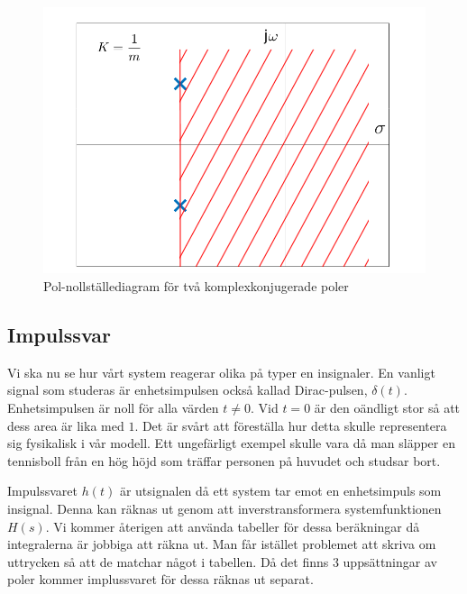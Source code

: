 \begin{figure}[H] %
    \centering
    \includegraphics[scale=0.33]{bilder/pol_nollstallediagram_komplexa_poler}
    \caption{Pol-nollställediagram för två komplexkonjugerade poler}
    \label{fig:pol_nollstallediagram_komplexa_poler}
\end{figure}
 
\newpage
\subsection{Impulssvar}
Vi ska nu se hur vårt system reagerar olika på typer en insignaler. En vanligt signal som studeras är enhetsimpulsen också kallad Dirac-pulsen, $\delta(t)$. 
Enhetsimpulsen är noll för alla värden $t\ne 0$. Vid $t = 0$ är den oändligt stor så att dess area är lika med $1$. Det är svårt att föreställa hur detta skulle representera sig fysikalisk i vår modell. Ett ungefärligt exempel skulle vara då man släpper en tennisboll från en hög höjd som träffar personen på huvudet och studsar bort. 

Impulssvaret $h(t)$ är utsignalen då ett system tar emot en enhetsimpuls som insignal. Denna kan räknas ut genom att inverstransformera systemfunktionen $H(s)$. Vi kommer återigen att använda tabeller för dessa beräkningar då integralerna är jobbiga att räkna ut. Man får istället problemet att skriva om uttrycken så att de matchar något i tabellen. Då det finns 3 uppsättningar av poler kommer implussvaret för dessa räknas ut separat.

